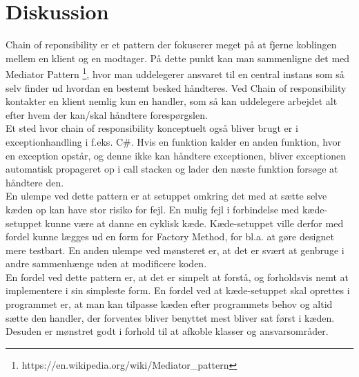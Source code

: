 \chapter{Diskussion}
Chain of reponsibility er et pattern der fokuserer meget på at fjerne koblingen mellem en klient og en modtager. På dette punkt kan man sammenligne det med Mediator Pattern \footnote{https://en.wikipedia.org/wiki/Mediator\_pattern}, hvor man uddelegerer ansvaret til en central instans som så selv finder ud hvordan en bestemt besked håndteres.
Ved Chain of responsibility kontakter en klient nemlig kun en handler, som så kan uddelegere arbejdet alt efter hvem der kan/skal håndtere forespørgslen. \\

\noindent Et sted hvor chain of responsibility konceptuelt også bliver brugt er i exceptionhandling i f.eks. C\#. Hvis en funktion kalder en anden funktion, hvor en exception opstår, og denne ikke kan håndtere exceptionen, bliver exceptionen automatisk propageret op i call stacken og lader den næste funktion forsøge at håndtere den. \\

\noindent En ulempe ved dette pattern er at setuppet omkring det med at sætte selve kæden op kan have stor risiko for fejl. En mulig fejl i forbindelse med kæde-setuppet kunne være at danne en cyklisk kæde. Kæde-setuppet ville derfor med fordel kunne lægges ud en form for Factory Method, for bl.a. at gøre designet mere testbart. En anden ulempe ved mønsteret er, at det er svært at genbruge i andre sammenhænge uden at modificere koden. \\
En fordel ved dette pattern er, at det er simpelt at forstå, og forholdsvis nemt at implementere i sin simpleste form. En fordel ved at kæde-setuppet skal oprettes i programmet er, at man kan tilpasse kæden efter programmets behov og altid sætte den handler, der forventes bliver benyttet mest bliver sat først i kæden. 
Desuden er mønstret godt i forhold til at afkoble klasser og ansvarsområder.